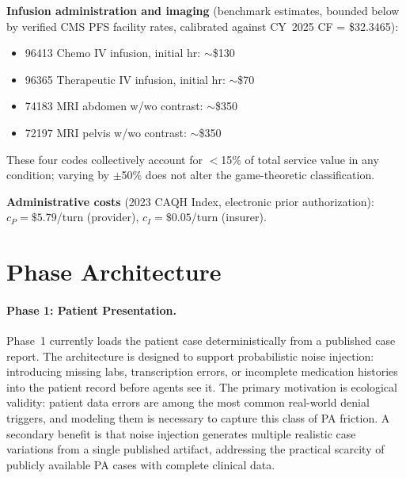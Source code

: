 \textbf{Infusion administration and imaging} (benchmark estimates, bounded below by verified CMS PFS facility rates, calibrated against CY~2025 CF = \$32.3465):
\begin{itemize}
  \item 96413 Chemo IV infusion, initial hr: ${\sim}$\$130
  \item 96365 Therapeutic IV infusion, initial hr: ${\sim}$\$70
  \item 74183 MRI abdomen w/wo contrast: ${\sim}$\$350
  \item 72197 MRI pelvis w/wo contrast: ${\sim}$\$350
\end{itemize}

These four codes collectively account for $<$15\% of total service value in any condition; varying by $\pm$50\% does not alter the game-theoretic classification.

\textbf{Administrative costs} (2023 CAQH Index, electronic prior authorization): $c_P = \$5.79$/turn (provider), $c_I = \$0.05$/turn (insurer).

\section{Phase Architecture}
\label{sec:phase-design}

\paragraph{Phase 1: Patient Presentation.}
Phase~1 currently loads the patient case deterministically from a published case report. The architecture is designed to support probabilistic noise injection: introducing missing labs, transcription errors, or incomplete medication histories into the patient record before agents see it. The primary motivation is ecological validity: patient data errors are among the most common real-world denial triggers, and modeling them is necessary to capture this class of PA friction. A secondary benefit is that noise injection generates multiple realistic case variations from a single published artifact, addressing the practical scarcity of publicly available PA cases with complete clinical data.

